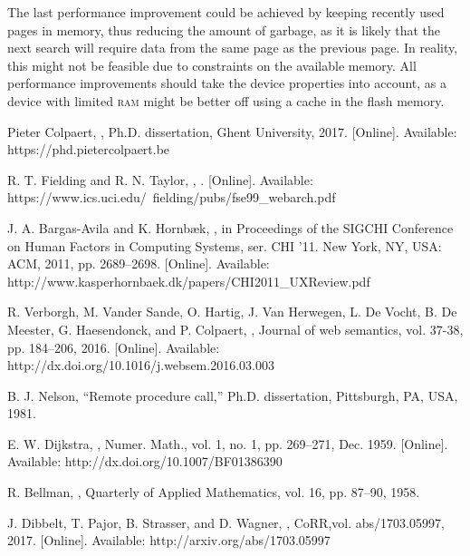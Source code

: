 \documentclass[twocolumn]{phdsymp} %
\begin{document}
The last performance improvement could be achieved by keeping recently used pages in memory, thus reducing the amount of garbage, as it is likely that the next search will require data from the same page as the previous page. In reality, this might not be feasible due to constraints on the available memory. All performance improvements should take the device properties into account, as a device with limited \textsc{ram} might be better off using a cache in the flash memory.

\nocite{*}



%
\begin{thebibliography}{1}
Pieter Colpaert,
,
\newblock Ph.D. dissertation, Ghent University, 2017. [Online]. Available: https://phd.pietercolpaert.be

R. T. Fielding and R. N. Taylor, 
,
. [Online]. Available: https://www.ics.uci.edu/~fielding/pubs/fse99\_webarch.pdf

J. A. Bargas-Avila and K. Hornbæk, 
,
in Proceedings of the SIGCHI Conference on Human Factors in Computing Systems, ser. CHI ’11. New York, NY, USA: ACM, 2011, pp. 2689–2698. [Online]. Available: http://www.kasperhornbaek.dk/papers/CHI2011\_UXReview.pdf

R. Verborgh, M. Vander Sande, O. Hartig, J. Van Herwegen, L. De Vocht, B. De Meester, G. Haesendonck, and P. Colpaert, 
,
\newblock Journal of web semantics, vol. 37-38, pp. 184–206, 2016. [Online]. Available: http://dx.doi.org/10.1016/j.websem.2016.03.003

B. J. Nelson, “Remote procedure call,” Ph.D. dissertation, Pittsburgh, PA, USA, 1981.

E. W. Dijkstra, 
,
\newblock Numer. Math., vol. 1, no. 1, pp. 269–271, Dec. 1959. [Online]. Available: http://dx.doi.org/10.1007/BF01386390

R. Bellman,
,
\newblock Quarterly of Applied Mathematics, vol. 16, pp. 87–90, 1958.

J. Dibbelt, T. Pajor, B. Strasser, and D. Wagner,
,
\newblock CoRR,vol. abs/1703.05997, 2017. [Online]. Available: http://arxiv.org/abs/1703.05997

\end{thebibliography}
%
\end{document}
